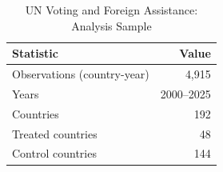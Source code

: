 \begin{table}
\caption{UN Voting and Foreign Assistance: Analysis Sample}
\label{tab:data_summary}
\begin{tabular}{lr}
\toprule
Statistic & Value \\
\midrule
Observations (country-year) & 4,915 \\
Years & 2000–2025 \\
Countries & 192 \\
Treated countries & 48 \\
Control countries & 144 \\
\bottomrule
\end{tabular}
\end{table}
